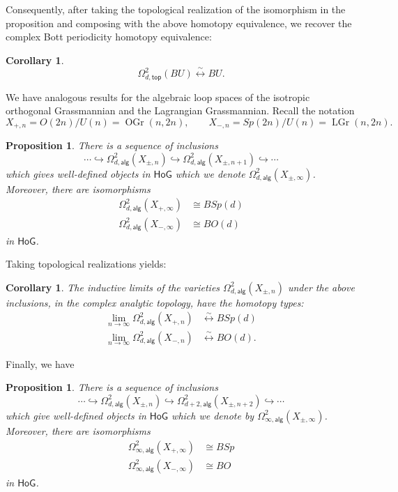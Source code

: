 \documentclass{amsart}
\newtheorem{proposition}[theorem]{Proposition}
\newtheorem{corollary}[theorem]{Corollary}
\theoremstyle{definition}
\newcommand{\HoG}{\textsf{HoG}}
\newcommand{\alg}{\mathsf{alg}}
\renewcommand{\top}{\mathsf{top}}
\newcommand{\LGr}{\operatorname{LGr}}
\newcommand{\OGr}{\operatorname{OGr}}
\newcommand{\LoopTwo}{\Omega^{2}_{d,\alg}}
\newcommand{\LoopTwoTop}{\Omega^{2}_{d,\top}}
\newcommand{\homotopyeq}{\overset \sim \longleftrightarrow}
\begin{document}
Consequently, after taking the topological realization of the
isomorphism in the proposition and composing with the above homotopy
equivalence, we recover the complex Bott periodicity homotopy
equivalence:

\begin{corollary}
\[
\LoopTwoTop (BU)\homotopyeq BU.
\]
\end{corollary}

We have analogous results for the algebraic loop spaces of the
isotropic orthogonal Grassmannian and the Lagrangian
Grassmannian. Recall the notation
\[
X_{+,n} =  O(2n)/U(n) = \OGr (n,2n),\quad  \quad X_{-,n} = Sp(2n)/U(n)=\LGr (n,2n).
\]

\begin{proposition}\label{prop: Loop2(X+,inrty)=BSp(d) in HoG and same
for X-}
There is a sequence of inclusions
\[
\dotsb \hookrightarrow \LoopTwo (X_{\pm ,n})  \hookrightarrow \LoopTwo
(X_{\pm ,n+1}) \hookrightarrow \dotsb 
\]
which gives well-defined objects in $\HoG$ which we denote $\LoopTwo
(X_{\pm,\infty })$. Moreover, there are isomorphisms
\begin{align*}
\LoopTwo (X_{+,\infty})&\cong BSp(d)\\
\LoopTwo (X_{-,\infty})&\cong BO(d)
\end{align*}
in $\HoG$. 
\end{proposition}
Taking topological realizations yields:
\begin{corollary}
The inductive limits of the varieties $\LoopTwo (X_{\pm ,n})$ under
the above inclusions, in the complex analytic topology, have the
homotopy types:
\begin{align*}
\lim_{n\to \infty }\LoopTwo (X_{+,n})&\homotopyeq  BSp(d)\\
\lim_{n\to \infty }\LoopTwo (X_{-,n})&\homotopyeq  BO(d).
\end{align*}
\end{corollary}

Finally, we have
\begin{proposition}\label{prop: Loop2inftyX+=BSp in HoG and similar for X-}
There is a sequence of inclusions
\[
\dotsb \hookrightarrow \LoopTwo (X_{\pm ,n})
\hookrightarrow \Omega^{2}_{d+2,\alg} (X_{\pm ,n+2}) \hookrightarrow \dotsb 
\]
which give well-defined objects in $\HoG$ which we denote by
$\Omega^{2}_{\infty ,\alg}(X_{\pm ,\infty})$. Moreover, there are
isomorphisms
\begin{align*}
\Omega^{2}_{\infty ,\alg}(X_{+,\infty})&\cong BSp\\
\Omega^{2}_{\infty ,\alg}(X_{-,\infty})&\cong BO
\end{align*}
in $\HoG$.
\end{proposition}
\end{document}
